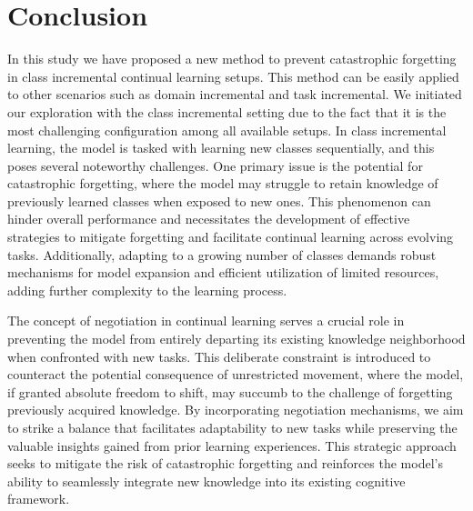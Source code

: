 \documentclass{article}
\begin{document}
\section{Conclusion}


In this study we have proposed a new method to prevent catastrophic forgetting in class incremental continual learning setups. This method can be easily applied to other scenarios such as domain incremental and task incremental. We initiated our exploration with the class incremental setting due to the fact that it is the most challenging configuration among all available setups. In class incremental learning, the model is tasked with learning new classes sequentially, and this poses several noteworthy challenges. One primary issue is the potential for catastrophic forgetting, where the model may struggle to retain knowledge of previously learned classes when exposed to new ones. This phenomenon can hinder overall performance and necessitates the development of effective strategies to mitigate forgetting and facilitate continual learning across evolving tasks. Additionally, adapting to a growing number of classes demands robust mechanisms for model expansion and efficient utilization of limited resources, adding further complexity to the learning process.

The concept of negotiation in continual learning serves a crucial role in preventing the model from entirely departing its existing knowledge neighborhood when confronted with new tasks. This deliberate constraint is introduced to counteract the potential consequence of unrestricted movement, where the model, if granted absolute freedom to shift, may succumb to the challenge of forgetting previously acquired knowledge. By incorporating negotiation mechanisms, we aim to strike a balance that facilitates adaptability to new tasks while preserving the valuable insights gained from prior learning experiences. This strategic approach seeks to mitigate the risk of catastrophic forgetting and reinforces the model's ability to seamlessly integrate new knowledge into its existing cognitive framework.
\end{document}
